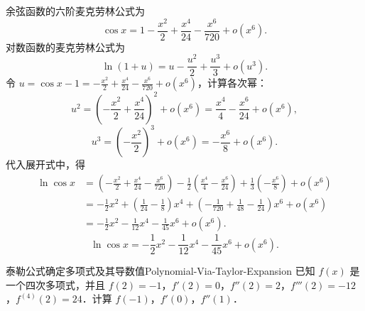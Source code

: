 \begin{solution}
    余弦函数的六阶麦克劳林公式为
    \begin{equation}
        \cos x = 1 - \frac{x^2}{2} + \frac{x^4}{24} - \frac{x^6}{720} + o(x^6).
    \end{equation}
    对数函数的麦克劳林公式为
    \begin{equation}
        \ln(1 + u) = u - \frac{u^2}{2} + \frac{u^3}{3} + o(u^3).
    \end{equation}
    令 $u = \cos x - 1 = -\frac{x^2}{2} + \frac{x^4}{24} - \frac{x^6}{720} + o(x^6)$，计算各次幂：
    \begin{equation}
        u^2 = \left( -\frac{x^2}{2} + \frac{x^4}{24} \right)^2 + o(x^6) = \frac{x^4}{4} - \frac{x^6}{24} + o(x^6),
    \end{equation}
    \begin{equation}
        u^3 = \left( -\frac{x^2}{2} \right)^3 + o(x^6) = -\frac{x^6}{8} + o(x^6).
    \end{equation}
    代入展开式中，得
    \begin{equation}
        \begin{aligned}
            \ln\cos x & = \left( -\frac{x^2}{2} + \frac{x^4}{24} - \frac{x^6}{720} \right) - \frac{1}{2}\left( \frac{x^4}{4} - \frac{x^6}{24} \right) + \frac{1}{3}\left( -\frac{x^6}{8} \right) + o(x^6) \\
                      & = -\frac{1}{2}x^2 + \left( \frac{1}{24} - \frac{1}{8} \right)x^4 + \left( -\frac{1}{720} + \frac{1}{48} - \frac{1}{24} \right)x^6 + o(x^6)                                        \\
                      & = -\frac{1}{2}x^2 - \frac{1}{12}x^4 - \frac{1}{45}x^6 + o(x^6).
        \end{aligned}
    \end{equation}
    \begin{equation}
        \boxed{\ln\cos x = -\frac{1}{2}x^2 - \frac{1}{12}x^4 - \frac{1}{45}x^6 + o(x^6).}
    \end{equation}
\end{solution}

\begin{problem}{泰勒公式确定多项式及其导数值}{Polynomial-Via-Taylor-Expansion}
    已知 $f(x)$ 是一个四次多项式，并且 $f(2) = -1$，$f'(2) = 0$，$f''(2) = 2$，$f'''(2) = -12$，$f^{(4)}(2) = 24$．计算 $f(-1)$，$f'(0)$，$f''(1)$．
\end{problem}

